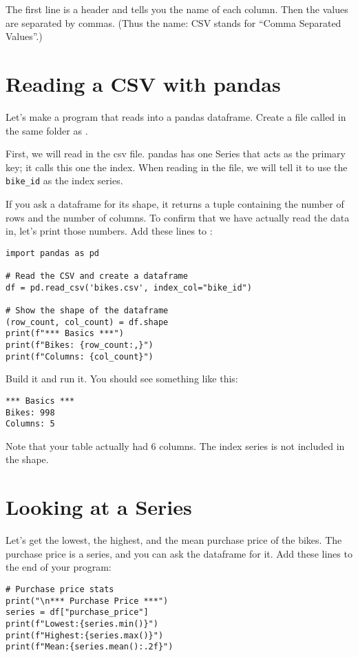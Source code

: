 The first line is a header and tells you the name of each column.
Then the values are separated by commas. (Thus the name: CSV stands
for ``Comma Separated Values''.)

\section{Reading a CSV with pandas}

Let's make a program that reads  into a pandas
dataframe.  Create a file called  in the same
folder as .

First, we will read in the csv file. pandas has one Series that acts
as the primary key; it calls this one the index. When reading in the
file, we will tell it to use the \texttt{bike\_id} as the index
series.

If you ask a dataframe for its shape, it returns a tuple containing
the number of rows and the number of columns. To confirm that we have
actually read the data in, let's print those numbers.  Add these lines
to :

\begin{Verbatim}
import pandas as pd

# Read the CSV and create a dataframe
df = pd.read_csv('bikes.csv', index_col="bike_id")

# Show the shape of the dataframe
(row_count, col_count) = df.shape
print(f"*** Basics ***")
print(f"Bikes: {row_count:,}")
print(f"Columns: {col_count}")
\end{Verbatim}

Build it and run it. You should see something like this:
\begin{Verbatim}
*** Basics ***
Bikes: 998
Columns: 5
\end{Verbatim}

Note that your table actually had 6 columns. The index series is
not included in the shape.

\section{Looking at a Series}

Let's get the lowest, the highest, and the mean purchase price of the
bikes.  The purchase price is a series, and you can ask the dataframe
for it. Add these lines to the end of your program:

\begin{Verbatim}
# Purchase price stats
print("\n*** Purchase Price ***")
series = df["purchase_price"]
print(f"Lowest:{series.min()}")
print(f"Highest:{series.max()}")
print(f"Mean:{series.mean():.2f}")
\end{Verbatim}

